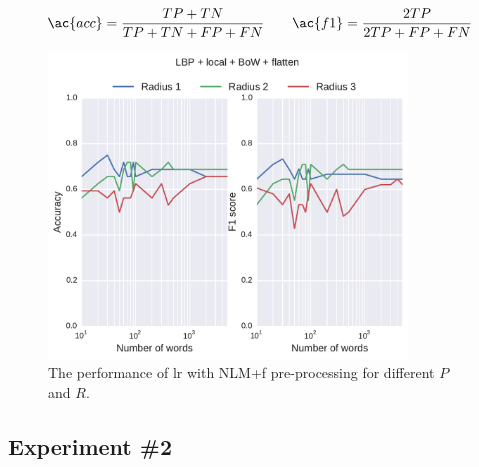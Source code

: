 
\begin{align}
\ac{acc} = \frac{TP+TN}{TP+TN+FP+FN} \qquad \ac{f1} = \frac{2TP}{2TP +FP+FN}
\label{eq:accf1}
\end{align}

\begin{figure}
\centering
\includegraphics[width=0.85\textwidth]{figure2}
\caption{The performance of \ac{lr} with NLM+\ac{f} pre-processing for different $P$ and $R$.}
\label{fig:RBOW}
\end{figure}




\subsection{Experiment \#2}\label{subsec:exp2}
%
%
%
%

